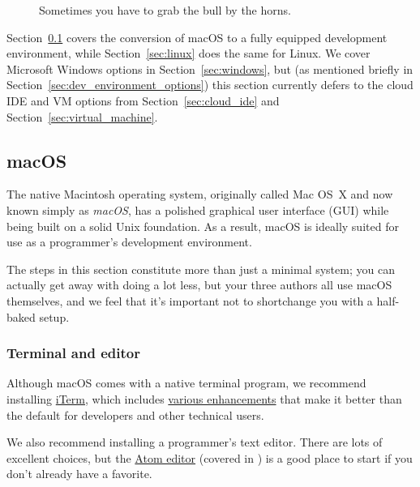 \begin{figure}
\begin{center}
\end{center}
\caption{Sometimes you have to grab the bull by the horns.\label{fig:grab_bull_by_horns}}
\end{figure}

Section~\ref{sec:macos} covers the conversion of macOS to a fully equipped development environment, while Section~\ref{sec:linux} does the same for Linux. We cover Microsoft Windows options in Section~\ref{sec:windows}, but (as mentioned briefly in Section~\ref{sec:dev_environment_options}) this section currently defers to the cloud IDE and VM options from Section~\ref{sec:cloud_ide} and Section~\ref{sec:virtual_machine}.


\subsection{macOS} %
\label{sec:macos}

The native Macintosh operating system, originally called Mac OS~X and now known simply as \emph{macOS}, has a polished graphical user interface (GUI) while being built on a solid Unix foundation. As a result, macOS is ideally suited for use as a programmer's development environment.

The steps in this section constitute more than just a minimal system; you can actually get away with doing a lot less, but your three authors all use macOS themselves, and we feel that it's important not to shortchange you with a half-baked setup.

\subsubsection{Terminal and editor} %
\label{sec:terminal_and_editor}

Although macOS comes with a native terminal program, we recommend installing \href{https://www.iterm2.com/downloads.html}{iTerm}, which includes \href{https://www.iterm2.com/features.html}{various enhancements} that make it better than the default for developers and other technical users.

We also recommend installing a programmer's text editor. There are lots of excellent choices, but the \href{https://atom.io/}{Atom editor} (covered in ) is a good place to start if you don't already have a favorite.



